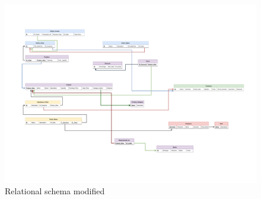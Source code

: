 \begin{figure}[H]
\centering
\includegraphics[width=\textwidth]{Schemas/LogicRS_modified.drawio.pdf}
\caption{Relational schema modified}
\label{ls_modified}
\end{figure}